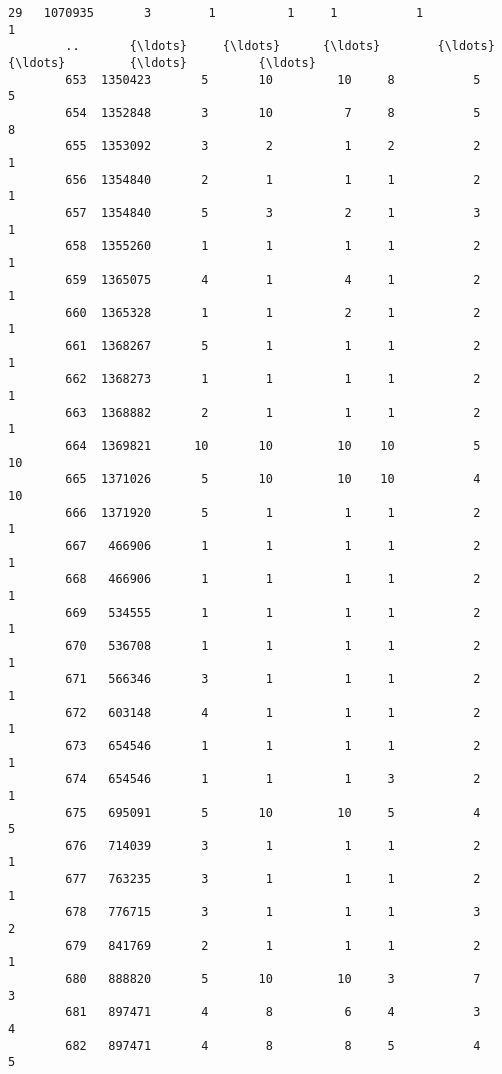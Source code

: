 \documentclass[11pt]{article}
\begin{document}
\begin{Verbatim}[commandchars=\\\{\}]
        29   1070935       3        1          1     1           1            1   
        ..       {\ldots}     {\ldots}      {\ldots}        {\ldots}   {\ldots}         {\ldots}          {\ldots}   
        653  1350423       5       10         10     8           5            5   
        654  1352848       3       10          7     8           5            8   
        655  1353092       3        2          1     2           2            1   
        656  1354840       2        1          1     1           2            1   
        657  1354840       5        3          2     1           3            1   
        658  1355260       1        1          1     1           2            1   
        659  1365075       4        1          4     1           2            1   
        660  1365328       1        1          2     1           2            1   
        661  1368267       5        1          1     1           2            1   
        662  1368273       1        1          1     1           2            1   
        663  1368882       2        1          1     1           2            1   
        664  1369821      10       10         10    10           5           10   
        665  1371026       5       10         10    10           4           10   
        666  1371920       5        1          1     1           2            1   
        667   466906       1        1          1     1           2            1   
        668   466906       1        1          1     1           2            1   
        669   534555       1        1          1     1           2            1   
        670   536708       1        1          1     1           2            1   
        671   566346       3        1          1     1           2            1   
        672   603148       4        1          1     1           2            1   
        673   654546       1        1          1     1           2            1   
        674   654546       1        1          1     3           2            1   
        675   695091       5       10         10     5           4            5   
        676   714039       3        1          1     1           2            1   
        677   763235       3        1          1     1           2            1   
        678   776715       3        1          1     1           3            2   
        679   841769       2        1          1     1           2            1   
        680   888820       5       10         10     3           7            3   
        681   897471       4        8          6     4           3            4   
        682   897471       4        8          8     5           4            5   
        

\end{Verbatim}
\end{document}
